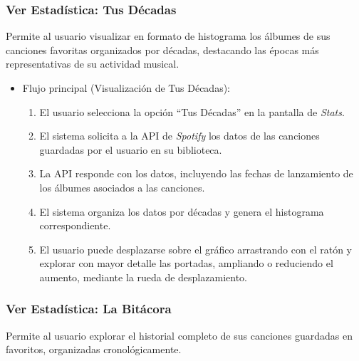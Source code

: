 \subsubsection*{Ver Estadística: Tus Décadas}

Permite al usuario visualizar en formato de histograma los álbumes de sus canciones favoritas organizados por décadas, destacando las épocas más representativas de su actividad musical.

\begin{itemize}
    \item Flujo principal (Visualización de Tus Décadas):
          \begin{enumerate}
              \item El usuario selecciona la opción ``Tus Décadas'' en la pantalla de \textit{Stats}.
              \item El sistema solicita a la API de \textit{Spotify} los datos de las canciones guardadas por el usuario en su biblioteca.
              \item La API responde con los datos, incluyendo las fechas de lanzamiento de los álbumes asociados a las canciones.
              \item El sistema organiza los datos por décadas y genera el histograma correspondiente.
              \item El usuario puede desplazarse sobre el gráfico arrastrando con el ratón y explorar con mayor detalle las portadas, ampliando o reduciendo el aumento, mediante la rueda de desplazamiento.
          \end{enumerate}
\end{itemize}

\subsubsection*{Ver Estadística: La Bitácora}

Permite al usuario explorar el historial completo de sus canciones guardadas en favoritos, organizadas cronológicamente.

